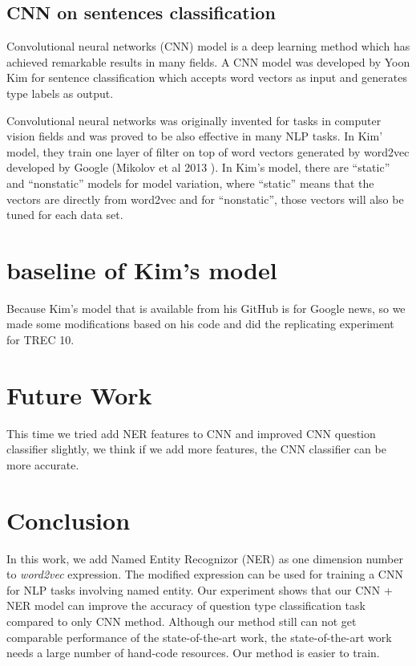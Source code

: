 \documentclass[10pt,twocolumn,letterpaper]{article}
\begin{document}
\subsection{CNN on sentences classification}
Convolutional neural networks (CNN) model is a deep learning method which has achieved remarkable results in many fields. A CNN model was developed by Yoon Kim \cite{kim2014convolutional} for sentence classification which accepts word vectors as input and generates type labels as output.

Convolutional neural networks was originally invented for tasks in computer vision fields and was proved to be also effective in many NLP tasks. In Kim' model, they train one layer of filter on top of word vectors generated by word2vec developed by Google (Mikolov et al 2013 \cite{mikolov2013efficient}). In Kim's model, there are ``static'' and ``nonstatic'' models for model variation, where ``static'' means that the vectors are directly from word2vec and for ``nonstatic'', those vectors will also be tuned for each data set.



\section{baseline of Kim's model}
Because Kim's model that is available from his GitHub is for Google news, so we made some modifications based on his code and did the replicating experiment for TREC 10.

\section{Future Work}
This time we tried add NER features to CNN and improved CNN question classifier slightly, we think if we add more features, the CNN classifier can be more accurate.

\section{Conclusion}
In this work, we add Named Entity Recognizor (NER) as one dimension number to \textit{word2vec} expression. The modified expression can be used for training a CNN for NLP tasks involving named entity. Our experiment shows that our CNN + NER model can improve the accuracy of question type classification task compared to only CNN method. Although our method still can not get comparable performance of the state-of-the-art work, the state-of-the-art work needs a large number of hand-code resources. Our method is easier to train.



{\small
\nocite{*}


}
\end{document}
